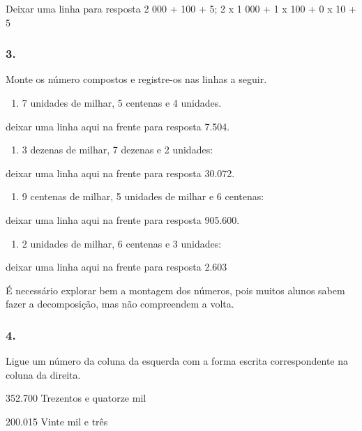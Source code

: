 \begin{enumerate}
Deixar uma linha para resposta
2 000 + 100 + 5; 2 x 1 000 + 1 x 100 + 0 x 10 + 5


\subsubsection{3.}\label{section-2}

Monte os número compostos e registre-os nas linhas a seguir.

\begin{enumerate}
\def\labelenumi{\alph{enumi})}
\item
  7 unidades de milhar, 5 centenas e 4 unidades.
\end{enumerate}

deixar uma linha aqui na frente para resposta
7.504.

\begin{enumerate}
\def\labelenumi{\alph{enumi})}
\item
  3 dezenas de milhar, 7 dezenas e 2 unidades:
\end{enumerate}

deixar uma linha aqui na frente para resposta
30.072.

\begin{enumerate}
\def\labelenumi{\alph{enumi})}
\item
  9 centenas de milhar, 5 unidades de milhar e 6 centenas:
\end{enumerate}

deixar uma linha aqui na frente para resposta
905.600.

\begin{enumerate}
\def\labelenumi{\alph{enumi})}
\item
  2 unidades de milhar, 6 centenas e 3 unidades:
\end{enumerate}

deixar uma linha aqui na frente para resposta
2.603

É necessário explorar bem a montagem dos números, pois muitos alunos sabem fazer a decomposição, mas não compreendem a volta.

\subsubsection{4.}\label{section-3}

Ligue um número da coluna da esquerda com a forma escrita correspondente na coluna da direita.

352.700 Trezentos e quatorze mil

200.015 Vinte mil e três


\end{enumerate}
